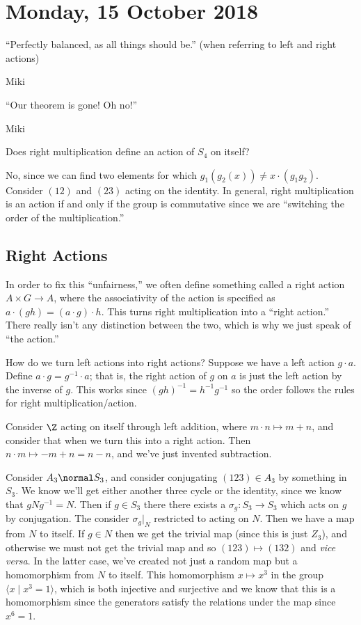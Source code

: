 \section{Monday, 15 October 2018}

\epigraph{``Perfectly balanced, as all things should be.'' (when referring to left and right actions)}{Miki}
\epigraph{``Our theorem is gone! Oh no!''}{Miki}

\begin{problem}
Does right multiplication define an action of $S_4$ on itself?
\end{problem}
\begin{solution}
No, since we can find two elements for which $g_1(g_2(x)) \not= x \cdot (g_1g_2)$. Consider $(12)$ and $(23)$ acting on the identity. In general, right multiplication is an action if and only if the group is commutative since we are ``switching the order of the multiplication.''
\end{solution}

\subsection{Right Actions}
In order to fix this ``unfairness,'' we often define something called a right action $A \times G \to A$, where the associativity of the action is specified as $a \cdot (gh) = (a \cdot g) \cdot h$. This turns right multiplication into a ``right action.'' There really isn't any distinction between the two, which is why we just speak of ``the action.''

How do we turn left actions into right actions? Suppose we have a left action $g \cdot a$. Define $a \cdot g = g^{-1} \cdot a$; that is, the right action of $g$ on $a$ is just the left action by the inverse of $g$. This works since $(gh)^{-1} = h^{-1}g^{-1}$ so the order follows the rules for right multiplication/action.

\begin{problem}
Consider $\Z$ acting on itself through left addition, where $m \cdot n \mapsto m + n$, and consider that when we turn this into a right action. Then $n \cdot m \mapsto -m + n = n - n$, and we've just invented subtraction.
\end{problem}

\begin{example}
Consider $A_3 \normal S_3$, and consider conjugating $(123) \in A_3$ by something in $S_3$. We know we'll get either another three cycle or the identity, since we know that $gNg^{-1} = N$. Then if $g \in S_3$ there there exists a $\sigma_g : S_3 \to S_3$ which acts on $g$ by conjugation. The consider $\sigma_g |_N$ restricted to acting on $N$. Then we have a map from $N$ to itself. If $g \in N$ then we get the trivial map (since this is just $Z_3$), and otherwise we must not get the trivial map and so $(123) \mapsto (132)$ and \emph{vice versa}. In the latter case, we've created not just a random map but a homomorphism from $N$ to itself. This homomorphism $x \mapsto x^3$ in the group $\langle x \mid x^3 = 1 \rangle$, which is both injective and surjective and we know that this is a homomorphism since the generators satisfy the relations under the map since $x^6 = 1$.
\end{example}

